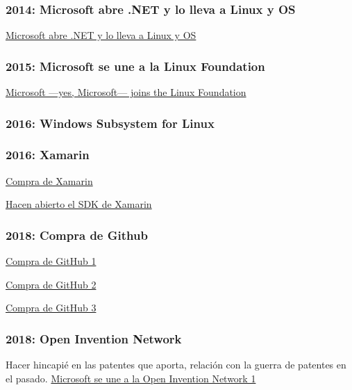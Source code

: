 \subsubsection{2014: Microsoft abre .NET y lo lleva a Linux y OS}
\href{https://arstechnica.com/information-technology/2014/11/microsoft-open-sources-net-takes-it-to-linux-and-os-x/}{Microsoft abre .NET y lo lleva a Linux y OS}

\subsubsection{2015: Microsoft se une a la Linux Foundation}
 \href{hhttps://arstechnica.com/information-technology/2016/11/microsoft-yes-microsoft-joins-the-linux-foundation/}{Microsoft ---yes, Microsoft--- joins the Linux Foundation}

\subsubsection{2016: Windows Subsystem for Linux}


\subsubsection{2016: Xamarin}
\href{https://www.genbeta.com/desarrollo/microsoft-adquiere-xamarin}{Compra de Xamarin}

\href{https://www.petri.com/microsofts-newly-acquired-xamarin-expands-developer-tools-new-features}{Hacen abierto el SDK de Xamarin}

\subsubsection{2018: Compra de Github}
\href{https://www.xataka.com/aplicaciones/oficial-microsoft-compra-github-7-500-millones-dolares}{Compra de GitHub 1}

\href{https://www.elconfidencial.com/tecnologia/2018-06-04/microsoft-ahora-ama-el-software-libre-compra-la-startup-github-por-7-500-millones_1573704/}{Compra de GitHub 2}

\href{https://www.xataka.com/aplicaciones/microsoft-punto-adquirir-github-desarrolladores-desarrolladores-desarrolladores}{Compra de GitHub 3}

\subsubsection{2018: Open Invention Network}
Hacer hincapié en las patentes que aporta, relación con la guerra de patentes en el pasado.
\href{https://azure.microsoft.com/en-us/blog/microsoft-joins-open-invention-network-to-help-protect-linux-and-open-source/}{Microsoft se une a la Open Invention Network 1}

